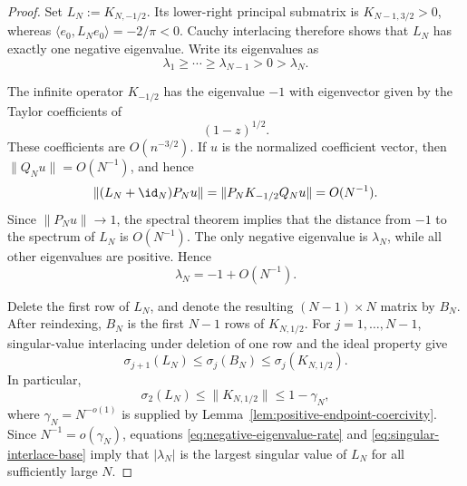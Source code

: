 \begin{proof}
Set $L_N:=K_{N,-1/2}$.  Its lower-right principal submatrix is
$K_{N-1,3/2}>0$, whereas
$\langle e_0,L_Ne_0\rangle=-2/\pi<0$.  Cauchy interlacing therefore shows that
$L_N$ has exactly one negative eigenvalue.  Write its eigenvalues as
\begin{equation}\label{eq:L-eigenvalues}
 \lambda_1\ge\cdots\ge\lambda_{N-1}>0>\lambda_N.
\end{equation}

The infinite operator $K_{-1/2}$ has the eigenvalue $-1$ with eigenvector given
by the Taylor coefficients of
\begin{equation}\label{eq:negative-half-eigenvector}
 (1-z)^{1/2}.
\end{equation}
These coefficients are $O(n^{-3/2})$.  If $u$ is the normalized coefficient
vector, then $\|Q_Nu\|=O(N^{-1})$, and hence
\[
 \|(L_N+\id_N)P_Nu\|
 =\|P_NK_{-1/2}Q_Nu\|=O(N^{-1}).
\]
Since $\|P_Nu\|\to1$, the spectral theorem implies that the distance from
$-1$ to the spectrum of $L_N$ is $O(N^{-1})$.  The only negative eigenvalue is
$\lambda_N$, while all other eigenvalues are positive.  Hence
\begin{equation}\label{eq:negative-eigenvalue-rate}
 \lambda_N=-1+O(N^{-1}).
\end{equation}

Delete the first row of $L_N$, and denote the resulting
$(N-1)\times N$ matrix by $B_N$.  After reindexing, $B_N$ is the first
$N-1$ rows of $K_{N,1/2}$.  For $j=1,\ldots,N-1$, singular-value
interlacing under deletion of one row and the ideal property give
\begin{equation}\label{eq:singular-interlace-full}
 \sigma_{j+1}(L_N)
 \le \sigma_j(B_N)
 \le \sigma_j(K_{N,1/2}).
\end{equation}
In particular,
\begin{equation}\label{eq:singular-interlace-base}
 \sigma_2(L_N)
 \le\|K_{N,1/2}\|
 \le1-\gamma_N,
\end{equation}
where $\gamma_N=N^{-o(1)}$ is supplied by
Lemma~\ref{lem:positive-endpoint-coercivity}.  Since
$N^{-1}=o(\gamma_N)$, equations \eqref{eq:negative-eigenvalue-rate} and
\eqref{eq:singular-interlace-base} imply that $|\lambda_N|$ is the largest
singular value of $L_N$ for all sufficiently large $N$.


\end{proof}
